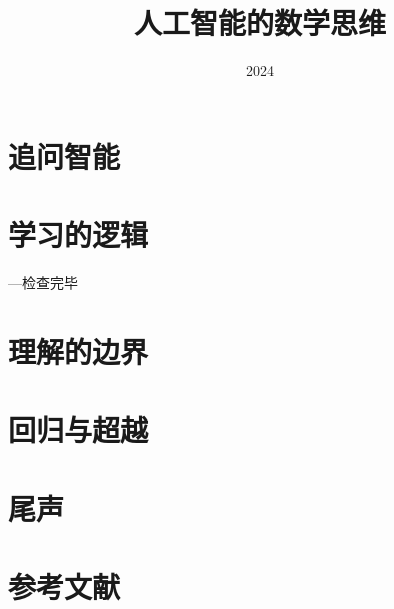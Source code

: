 \documentclass[lang=cn,scheme=chinese,12pt]{elegantbook}
\title{人工智能的数学思维}
\institute{华东师范大学 软件工程学院}
\date{2024}
\begin{document}
\maketitle


\frontmatter
\tableofcontents

\mainmatter   %


\part{追问智能}


\part{学习的逻辑}

 ---检查完毕 %
%

\part{理解的边界}

\part{回归与超越}


 

\part{尾声}



\part{参考文献}




\appendix                  %

%
 


\backmatter   
\end{document}
